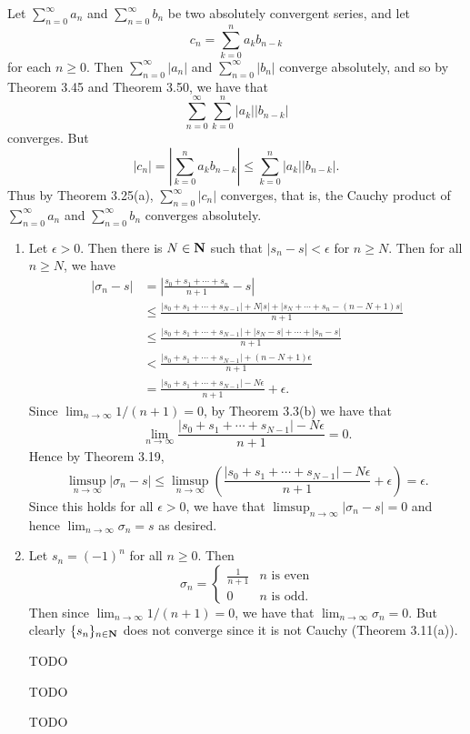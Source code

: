 \begin{ex}
Let $\sum_{n = 0}^{\infty}a_n$ and $\sum_{n = 0}^{\infty}b_n$ be two absolutely convergent series, and let \[c_n = \sum_{k = 0}^na_kb_{n-k}\] for each $n \geq 0$. Then $\sum_{n = 0}^{\infty}|a_n|$ and $\sum_{n = 0}^{\infty}|b_n|$ converge absolutely, and so by Theorem 3.45 and Theorem 3.50, we have that \[\sum_{n = 0}^{\infty}\sum_{k = 0}^n|a_k||b_{n-k}|\] converges. But \[|c_n| = \left|\sum_{k = 0}^na_kb_{n-k}\right| \leq \sum_{k = 0}^n|a_k||b_{n-k}|.\] Thus by Theorem 3.25(a), $\sum_{n = 0}^{\infty}|c_n|$ converges, that is, the Cauchy product of $\sum_{n = 0}^{\infty}a_n$ and $\sum_{n = 0}^{\infty}b_n$ converges absolutely.
\end{ex}

\begin{ex}
\begin{enumerate}
\item Let $\epsilon > 0$. Then there is $N \in \mathbf{N}$ such that $|s_n - s| < \epsilon$ for $n \geq N$. Then for all $n \geq N$, we have
\begin{align*}
|\sigma_n - s| & = \left|\frac{s_0 + s_1 + \cdots + s_n}{n + 1} - s\right|\\
& \leq \frac{|s_0 + s_1 + \cdots + s_{N-1}| + N|s| + |s_N + \cdots + s_n - (n-N+1)s|}{n+1}\\
& \leq \frac{|s_0 + s_1 + \cdots + s_{N-1}| + |s_N-s| + \cdots + |s_n-s|}{n+1}\\
& < \frac{|s_0+s_1+\cdots+s_{N-1}| + (n-N+1)\epsilon}{n+1}\\
& = \frac{|s_0+s_1+\cdots + s_{N-1}| - N\epsilon}{n+1} + \epsilon.
\end{align*}
Since $\lim_{n\to\infty}1/(n+1) = 0$, by Theorem 3.3(b) we have that \[\lim_{n\to\infty}\frac{|s_0+s_1+\cdots+s_{N-1}| - N\epsilon}{n+1} = 0.\] Hence by Theorem 3.19, \[\limsup_{n\to\infty}|\sigma_n-s| \leq \limsup_{n\to\infty}\left(\frac{|s_0 + s_1 + \cdots + s_{N-1}|-N\epsilon}{n+1} + \epsilon\right) = \epsilon.\] Since this holds for all $\epsilon > 0$, we have that $\limsup_{n\to\infty}|\sigma_n-s| = 0$ and hence $\lim_{n\to\infty}\sigma_n = s$ as desired.

\item Let $s_n = (-1)^n$ for all $n \geq 0$. Then \[\sigma_n = \begin{cases}
\frac{1}{n+1} & n\text{ is even}\\
0 & n\text{ is odd}.
\end{cases}\] Then since $\lim_{n\to\infty}1/(n+1) = 0$, we have that $\lim_{n\to\infty}\sigma_n = 0$. But clearly $\{s_n\}_{n\in\mathbf{N}}$ does not converge since it is not Cauchy (Theorem 3.11(a)).

\item [TODO]

\item [TODO]

\item [TODO]
\end{enumerate}
\end{ex}

